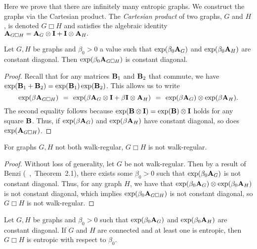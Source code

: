 Here we prove that there are infinitely many entropic graphs.
We construct the graphs via the Cartesian product.
The \emph{Cartesian product} of two graphs, $G$ and $H$, is denoted $G \Box H$ and satisfies the algebraic identity $\textbf{A}_{G \Box H} = \textbf{A}_G \otimes \textbf{I} + \textbf{I} \otimes \textbf{A}_H.$
\begin{lemma}\label{lem:cartesian-const-diag}
    Let $G, H$ be graphs and $\beta_0 > 0$ a value such that $\exp( \beta_0 \textbf{A}_{G})$ and $\exp( \beta_0 \textbf{A}_{H})$ are constant diagonal. Then $\exp(\beta_0 \textbf{A}_{G\Box H})$ is constant diagonal.
\end{lemma}
\begin{proof}
  Recall that for any matrices $\textbf{B}_1$ and $\textbf{B}_2$ that commute, we have $\exp(\textbf{B}_1 + \textbf{B}_2) = \exp(\textbf{B}_1)\exp(\textbf{B}_2)$.
  This allows us to write
  \[
    \exp( \beta \textbf{A}_{G \Box H}) \hspace{4pt} = \hspace{4pt} \exp( \beta\textbf{A}_G \otimes \textbf{I}  +  \beta\textbf{I} \otimes \textbf{A}_{H}) \hspace{4pt} = \hspace{4pt} \exp(\beta \textbf{A}_G)\otimes \exp(\beta \textbf{A}_H).
  \]
  The second equality follows because $\exp(\textbf{B} \otimes \textbf{I}) = \exp(\textbf{B})\otimes \textbf{I}$ holds for any square $\textbf{B}$.
  Thus, if $\exp(\beta \textbf{A}_G)$ and $\exp(\beta \textbf{A}_H)$ have constant diagonal, so does $\exp( \textbf{A}_{G \Box H})$.
\end{proof}
\begin{lemma}\label{lem:cart-non-walk-reg}
  For graphs $G, H$ not both walk-regular, $G\Box H$ is not walk-regular.
\end{lemma}
\begin{proof}
    Without loss of generality, let $G$ be not walk-regular.
    Then by a result of Benzi (~\cite{benzi2014note},~Theorem~2.1), there exists some $\beta_0 > 0$ such that $\exp(\beta_0 \textbf{A}_G)$ is not constant diagonal.
    Thus, for any graph $H$, we have that $\exp(\beta_0 \textbf{A}_G)\otimes\exp(\beta_0 \textbf{A}_H)$ is not constant diagonal, which implies $\exp(\beta_0 \textbf{A}_{G\Box H})$ is not constant diagonal, so $G \Box H$ is not walk-regular.
\end{proof}
\begin{theorem}\label{thm:cartesian-entropic}
    Let $G, H$ be graphs and $\beta_0 > 0$ such that $\exp( \beta_0 \textbf{A}_{G})$ and $\exp( \beta_0 \textbf{A}_{H})$ are constant diagonal.
    If $G$ and $H$ are connected and at least one is entropic, then $G \Box H$ is entropic with respect to $\beta_0$.
\end{theorem}
